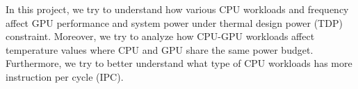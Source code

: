 In this project, we try to understand how various CPU workloads and frequency affect GPU performance and system power under thermal design power (TDP) constraint. Moreover, we try to analyze how CPU-GPU workloads affect temperature values where CPU and GPU share the same power budget. Furthermore, we try to better understand what type of CPU workloads has more instruction per cycle (IPC). 